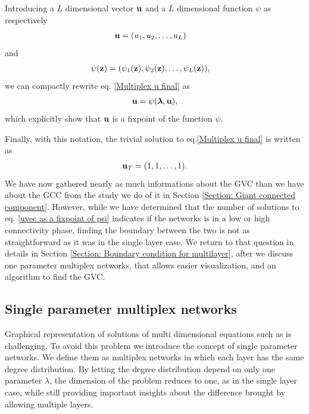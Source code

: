 \documentclass[
11pt, %
american, %
singlespacing, %
final, %
nolistspacing, %
liststotoc, %
headsepline, %
]{MastersDoctoralThesis} %
\begin{document}
Introducing a $L$ dimensional vector $\boldsymbol{\mathrm{u}}$ and a $L$ dimensional function $\psi$ as respectively
\begin{align}
	\boldsymbol{\mathrm{u}} &= (u_1, u_2, \dots, u_L)
\end{align}
and
\begin{align}
	\psi(\boldsymbol{\mathrm{z}}) &= (\psi_1(\boldsymbol{\mathrm{z}}), \psi_2(\boldsymbol{\mathrm{z}}), \dots, \psi_L(\boldsymbol{\mathrm{z}})),
\end{align}
we can compactly rewrite eq. \eqref{Multiplex u final} as
\begin{align}
	\boldsymbol{\mathrm{u}} = \psi(\boldsymbol{\mathrm{\lambda}}, \boldsymbol{\mathrm{u}}), \label{uvec as a fixpoint of psi}
\end{align}
which explicitly show that $\boldsymbol{\mathrm{u}}$ is a fixpoint of the function $\psi$.

Finally, with this notation, the trivial solution to eq.\eqref{Multiplex u final} is written as
\begin{align}
	\boldsymbol{\mathrm{u}}_T = (1, 1, \dots, 1). \label{Definition of multiplex trivial solution}
\end{align}
We have now gathered nearly as much informations about the GVC than we have about the GCC from the study we do of it in Section \ref{Section: Giant connected component}. However, while we have determined that the number of solutions to eq. \eqref{uvec as a fixpoint of psi} indicates if the networks is in a low or high connectivity phase, finding the boundary between the two is not as straightforward as it was in the single layer case. We return to that question in details in Section \ref{Section: Boundary condition for multilayer}, after we discuss one parameter multiplex networks, that allows easier visualization, and an algorithm to find the GVC.

\subsection{Single parameter multiplex networks}
\label{Section: Single parameter networks}

Graphical representation of solutions of multi dimensional equations such as  is challenging. To avoid this problem we introduce the concept of single parameter networks. We define them as multiplex networks in which each layer has the same degree distribution. By letting the degree distribution depend on only one parameter $\lambda$, the dimension of the problem reduces to one, as in the single layer case, while still providing important insights about the difference brought by allowing multiple layers.
\end{document}
